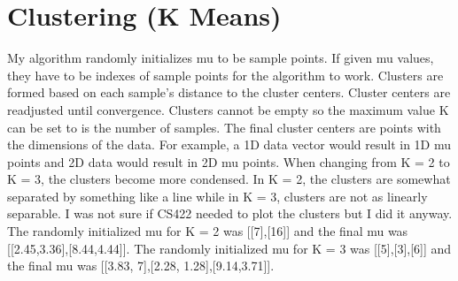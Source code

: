 \documentclass{article}
\begin{document}
\section*{Clustering (K Means)}
My algorithm randomly initializes mu to be sample points. If given mu values, they have to be indexes of sample points for the algorithm to work. Clusters are formed based on each sample's distance to the cluster centers. Cluster centers are readjusted until convergence. Clusters cannot be empty so the maximum value K can be set to is the number of samples. The final cluster centers are points with the dimensions of the data.  For example, a 1D data vector would result in 1D mu points and 2D data would result in 2D mu points. When changing from K = 2 to K = 3, the clusters become more condensed. In K = 2, the clusters are somewhat separated by something like a line while in K = 3, clusters are not as linearly separable.
\newline
\newline
I was not sure if CS422 needed to plot the clusters but I did it anyway. The randomly initialized mu for K = 2 was [[7],[16]] and the final mu was [[2.45,3.36],[8.44,4.44]]. The randomly initialized mu for K = 3 was [[5],[3],[6]] and the final mu was [[3.83, 7],[2.28, 1.28],[9.14,3.71]].
\end{document}
